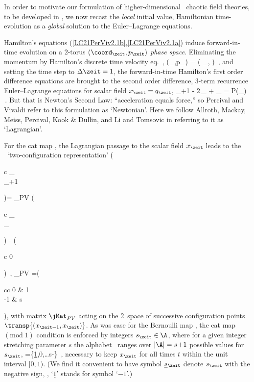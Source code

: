 In order to motivate our formulation of higher-dimensional \spt\ chaotic
field theories, to be developed in , we now recast the
\emph{local} initial value, Hamiltonian time-evolution  as a
\emph{global} solution to the Euler–Lagrange equations.

Hamilton's equations (\ref{LC21PerViv2.1b},\ref{LC21PerViv2.1a}) induce
forward-in-time evolution on a 2-torus  $(\coord_{\zeit},p_\zeit)$ {\em
phase space}.
Eliminating the momentum by Hamilton's discrete time velocity
eq.~,
\beq
(\coord_\zeit,p_\zeit) =
\left(
    \ssp_{\zeit},
\right)
\,,
and setting the time step to $\Delta\zeit=1$, the
forward-in-time Hamilton's first order difference equations are brought
to the second order difference, 3-term recurrence Euler–Lagrange equations
for scalar field $\ssp_{\zeit}=q_\zeit$,
\beq
\ssp_{\zeit+1} - 2\,\ssp_{\zeit} + \ssp_{} = P(\ssp_{\zeit})
\,.
But that is Newton's Second Law: ``acceleration equals
force,'' so Percival and Vivaldi refer to this formulation as
`Newtonian'. Here we follow Allroth, Mackay, Meiss,
Percival, Kook \& Dullin,
and Li and Tomsovic in referring  to it as `Lagrangian'.

For the cat map , the Lagrangian passage
 to the  scalar field  $\ssp_{\zeit}$ leads to the \PV\
`two-configuration representation'
\beq
 \left(\begin{array}{c}
 \ssp_{\zeit}  \\
 \ssp_{\zeit+1}
 \end{array} \right )=
 \jMat_{PV} \left(\begin{array}{c}
 \ssp_{}  \\
 \ssp_{\zeit}
 \end{array} \right ) %
 - \left(\begin{array}{c}
 0  \\
 \Ssym{\zeit}
 \end{array} \right )
 \,,  \qquad
 {\jMat_{PV}} =\left(\begin{array}{cc}
 0 & 1 \\
 -1 & s
 \end{array} \right ),
\ee{eq:StateSpCatMap}
with matrix $\jMat_{PV}$ acting on the 2\dmn\ space of successive
configuration points $\transp{(\ssp_{\zeit-1},\ssp_{\zeit})}$. As was
case for the Bernoulli map \refeq{1stepDiffEq}, the cat map
$(\mbox{mod}\;1)$ condition  is enforced by integers
$\Ssym{\zeit}\in  \A$, where for a given integer stretching parameter $s$
the alphabet \A\ ranges over $|\A|={s}\!+\!1$ possible values for
$\Ssym{\zeit}$,
\beq
\A=\{\underline{1},0,\dots s\!-\}
\,,
necessary  to keep $\ssp_{\zeit}$ for all times $t$ within the unit
interval $[0,1)$. (We find it convenient to have symbol
$\underline{\Ssym{}}{}_{\zeit}$ denote $\Ssym{\zeit}$ with the negative
sign, \ie, `$\underline{1}$' stands for symbol `$-1$'.)


